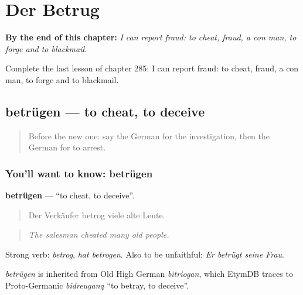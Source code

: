 
\chapter{Der Betrug}
\label{ch:ge-der-betrug}

\begin{chapteropening}
\textbf{By the end of this chapter:} \emph{I can report fraud: to cheat, fraud, a con man, to forge and to blackmail.}

Complete the last lesson of chapter 285: I can report fraud: to cheat, fraud, a con man, to forge and to blackmail.
\end{chapteropening}

\section[betrügen]{betrügen — to cheat, to deceive}

\label{lesson:GE-C285-betruegen}



\begin{quote}
Before the new one: say the German for the investigation, then the German for to arrest.
\end{quote}

\subsection*{You'll want to know: betrügen}
\textbf{betrügen} — \textquotedblleft{}to cheat, to deceive\textquotedblright{}.

\begin{quote}
Der Verkäufer betrog viele alte Leute.
\end{quote}

\begin{quote}
\emph{The salesman cheated many old people.}
\end{quote}

Strong verb: \emph{betrog}, \emph{hat betrogen}. Also to be unfaithful: \emph{Er betrügt seine Frau}.

\begin{cousinweb}
\emph{betrügen} is inherited from Old High German \emph{bitriogan}, which EtymDB traces to Proto-Germanic \emph{bidreuganą} \textquotedblleft{}to betray, to deceive\textquotedblright{}.
\end{cousinweb}

